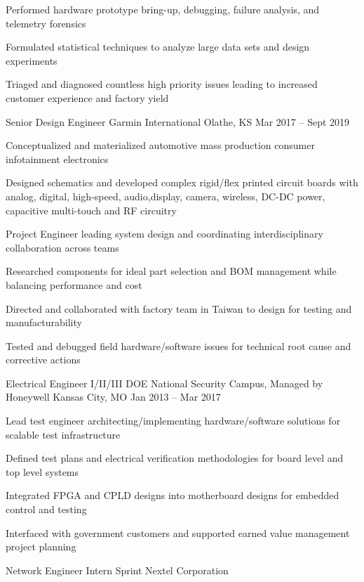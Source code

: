 \documentclass[]{awesome-cv}
\begin{document}
\begin{cventries}
{\begin{cvitems}
		\item {Performed hardware prototype bring-up, debugging, failure analysis, and telemetry forensics}
		\item {Formulated statistical techniques to analyze large data sets and design experiments}
		\item {Triaged and diagnosed countless high priority issues leading to increased customer experience and factory yield}
	\end{cvitems}}
	\cventry
	{Senior Design Engineer}
	{Garmin International}
	{Olathe, KS}
	{Mar 2017 – Sept 2019}
	{\begin{cvitems}
		\item {Conceptualized and materialized automotive mass production consumer infotainment electronics}
		\item {Designed schematics and developed complex rigid/flex printed circuit boards with analog, digital, high-speed, audio,\hfill \break  display, camera, wireless, DC-DC power, capacitive multi-touch and RF circuitry}
		\item {Project Engineer leading system design and coordinating interdisciplinary collaboration across teams}
		\item {Researched components for ideal part selection and BOM management while balancing performance and cost}
		\item {Directed and collaborated with factory team in Taiwan to design for testing and manufacturability}
		\item {Tested and debugged field hardware/software issues for technical root cause and corrective actions}
		\end{cvitems}}
	\cventry
	{Electrical Engineer I/II/III}
	{DOE National Security Campus, Managed by Honeywell}
	{Kansas City, MO}
	{Jan 2013 – Mar 2017}
	{\begin{cvitems}
		\item {Lead test engineer architecting/implementing hardware/software solutions for scalable test infrastructure}
		\item {Defined test plans and electrical verification methodologies for board level and top level systems}
		\item {Integrated FPGA and CPLD designs into motherboard designs for embedded control and testing}
		\item {Interfaced with government customers and supported earned value management project planning}
		\end{cvitems}}
	\cventry
	{Network Engineer Intern}
	{Sprint Nextel Corporation}

\end{cventries}
\end{document}
